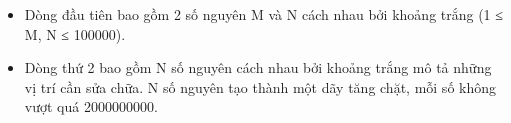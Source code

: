 \begin{itemize}
	\item     Dòng đầu tiên bao gồm 2 số nguyên M và N cách nhau bởi khoảng trắng (1 ≤ M, N ≤ 100000).   
	\item     Dòng thứ 2 bao gồm N số nguyên cách nhau bởi khoảng trắng mô tả những vị trí cần sửa chữa. N số nguyên tạo thành một dãy tăng chặt, mỗi số không vượt quá 2000000000.   
\end{itemize}